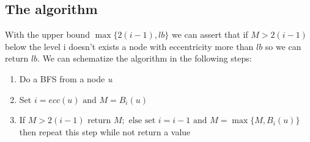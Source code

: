 \subsection{The algorithm}
With the upper bound $ \max\{2(i-1), lb\} $ we can assert that if $ M > 2(i-1) $ below the level i doesn't exists a node with eccentricity more than $ lb $
so we can return $ lb $.
We can schematize the algorithm in the following steps:
\begin{enumerate}
	\item Do a BFS from a node \textit{u}
	\item Set $ i = ecc(u) \text{ and } M = B_i(u)$ 
	\item If $ M > 2(i-1) \text{ return } M; \text{ else set } i = i-1  \text{ and } M = \max\{M, B_i(u)\}$ then repeat this step while not return a value
\end{enumerate}